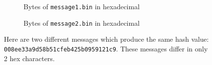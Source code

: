 \begin{figure}[tp]
\centering
\begin{subfigure}{0.465\textwidth}
    \centering
    \caption{Bytes of \texttt{message1.bin} in hexadecimal}
    \label{fig:message1}
    \end{subfigure}
    \vspace{0.5cm}

\begin{subfigure}{0.465\textwidth}
    \centering
    \caption{Bytes of \texttt{message2.bin} in hexadecimal}
    \label{fig:message2}
    \end{subfigure}

\caption[Example Messages Producing \MDFive{} Collision]{Here
    are two different messages which produce the same
    \MDFive{} hash value:
    \texttt{008ee33a9d58b51cfeb425b0959121c9}.
    These messages differ in only 2 hex characters.
    }
\label{fig:md5-collision}
\end{figure}
